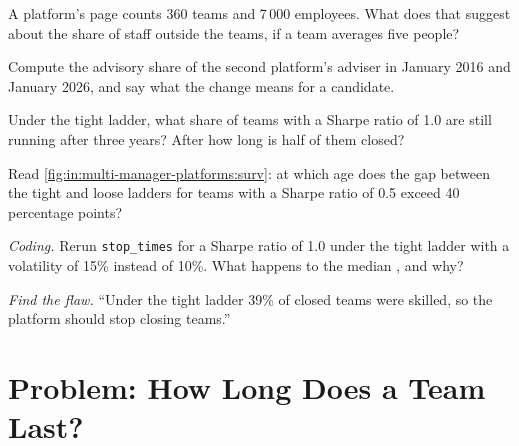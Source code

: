 \begin{exercise}[$\star$]\label{exo:in:multi-manager-platforms:3}
A platform's page counts 360 teams and 7\,000 employees. What does that suggest about the share of staff outside the
teams, if a team averages five people?
\end{exercise}

\begin{exercise}[$\star\star$]\label{exo:in:multi-manager-platforms:4}
Compute the advisory share of the second platform's adviser in January 2016 and January 2026, and say what the change
means for a candidate.
\end{exercise}

\begin{exercise}[$\star\star$]\label{exo:in:multi-manager-platforms:5}
Under the tight ladder, what share of teams with a Sharpe ratio of 1.0 are still running after three years? After how
long is half of them closed?
\end{exercise}

\begin{exercise}[$\star\star$]\label{exo:in:multi-manager-platforms:6}
Read \cref{fig:in:multi-manager-platforms:surv}: at which age does the gap between the tight and loose ladders for teams
with a Sharpe ratio of 0.5 exceed 40 percentage points?
\end{exercise}

\begin{exercise}[$\star\star\star$]\label{exo:in:multi-manager-platforms:7}
\emph{Coding.} Rerun \texttt{stop\_times} for a Sharpe ratio of 1.0 under the tight ladder with a volatility of 15\%
instead of 10\%. What happens to the median , and why?
\end{exercise}

\begin{exercise}[$\star\star\star$]\label{exo:in:multi-manager-platforms:8}
\emph{Find the flaw.} ``Under the tight ladder 39\% of closed teams were skilled, so the platform should stop closing
teams.''
\end{exercise}

\section{Problem: How Long Does a Team Last?}

